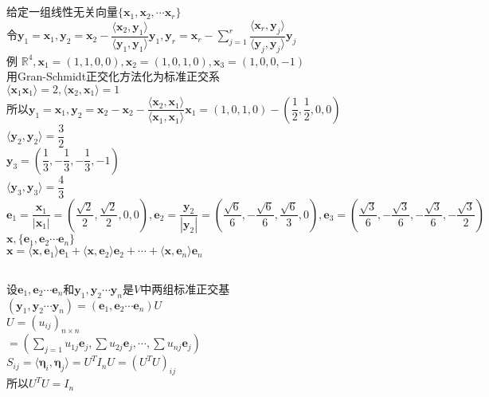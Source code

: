 \documentclass[11pt, a4paper, UTF8]{ctexart}
\begin{document}
\subsection{}
给定一组线性无关向量$\{\bm x_1,\bm x_2,\cdots\bm x_r\}$\\
令$\bm y_1=\bm x_1,\bm y_2=\bm x_2-\dfrac{\langle\bm x_2,\bm y_1\rangle}{\langle\bm y_1,\bm y_1\rangle}\bm y_1,\bm y_r=\bm x_r-\sum_{j=1}^r\dfrac{\langle\bm x_r,\bm y_j\rangle}{\langle\bm y_j,\bm y_j\rangle}\bm y_j$\\
例
$\mathbb{R}^4,\bm x_1=(1,1,0,0),\bm x_2=(1,0,1,0),\bm x_3=(1,0,0,-1)$\\
用Gran-Schmidt正交化方法化为标准正交系\\
$\langle\bm x_1\bm x_1\rangle=2,\langle\bm x_2,\bm x_1\rangle=1$\\
所以$\bm y_1=\bm x_1,\bm y_2=\bm x_2-\bm x_2-\dfrac{\langle\bm x_2,\bm x_1\rangle}{\langle\bm x_1,\bm x_1\rangle}\bm x_1=(1,0,1,0)-(\dfrac{1}{2},\dfrac{1}{2},0,0)$\\
$\langle\bm y_2,\bm y_2\rangle=\dfrac{3}{2}$\\
$\bm y_3=(\dfrac{1}{3},-\dfrac{1}{3},-\dfrac{1}{3},-1)$\\
$\langle\bm y_3,\bm y_3\rangle=\dfrac{4}{3}$\\
$\bm e_1=\dfrac{\bm x_1}{|\bm x_1|}=(\dfrac{\sqrt{2}}{2},\dfrac{\sqrt{2}}{2},0,0),\bm e_2=\dfrac{\bm y_2}{|\bm y_2|}=(\dfrac{\sqrt{6}}{6},-\dfrac{\sqrt{6}}{6},\dfrac{\sqrt{6}}{3},0),\bm e_3=(\dfrac{\sqrt{3}}{6},-\dfrac{\sqrt{3}}{6},-\dfrac{\sqrt{3}}{6},-\dfrac{\sqrt{3}}{2})$\\
$\bm x,\{\bm e_1,\bm e_2\cdots\bm e_n\}$\\
$\bm x=\langle\bm x,\bm e_1\rangle\bm e_1+\langle\bm x,\bm e_2\rangle\bm e_2+\cdots+\langle\bm x,\bm e_n\rangle\bm e_n$\\
\subsection{}
设$\bm e_1,\bm e_2\cdots\bm e_n$和$\bm y_1,\bm y_2\cdots\bm y_n$是$V$中两组标准正交基\\
$(\bm y_1,\bm y_2\cdots\bm y_n)=(\bm e_1,\bm e_2\cdots\bm e_n)U$\\
$U=(u_{ij})_{n\times n}$\\
$=(\sum_{j=1}u_{1j}\bm e_j,\sum u_{2j}\bm e_j,\cdots,\sum u_{nj}\bm e_j)$\\
$S_{ij}=\langle\bm\eta_i,\bm \eta_j\rangle=U^TI_nU=(U^TU)_{ij}$\\
所以$U^TU=I_n$\\
\end{document}
